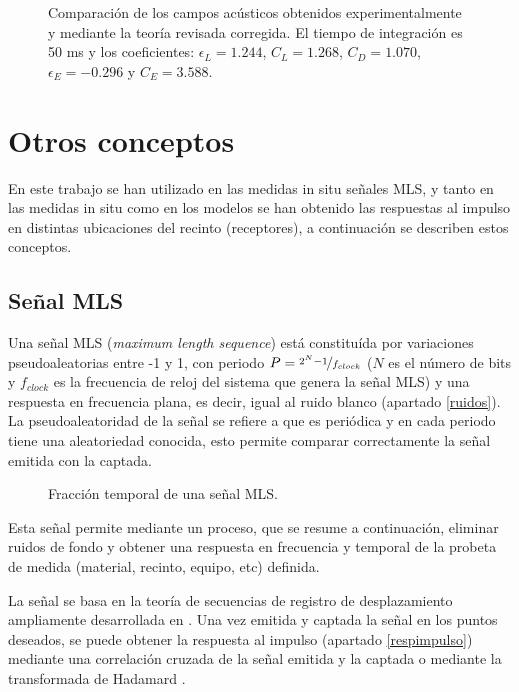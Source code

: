 \begin{figure}[ht]
    \centering
    {
    
    }
    \caption{Comparación de los campos acústicos obtenidos experimentalmente y mediante la teoría revisada corregida. El tiempo de integración es 50 ms y los coeficientes: $\epsilon_L=1.244$, $C_L=1.268$, $C_D=1.070$, $\epsilon_E=-0.296$ y $C_E=3.588$.}
    \label{graf:corregida}
\end{figure}
\FloatBarrier

\section{Otros conceptos}
En este trabajo se han utilizado en las medidas in situ señales MLS, y tanto en las medidas in situ como en los modelos se han obtenido las respuestas al impulso en distintas ubicaciones del recinto (receptores), a continuación se describen estos conceptos.


\subsection{Señal MLS}

Una señal MLS (\textit{maximum length sequence}) está constituída por variaciones pseudoaleatorias entre -1 y 1, con periodo $P=\nicefrac{2^N-1}{f_{clock}}$ ($N$ es el número de bits y $f_{clock}$ es la frecuencia de reloj del sistema que genera la señal MLS) y una respuesta en frecuencia plana, es decir, igual al ruido blanco (apartado \ref{ruidos}). La pseudoaleatoridad de la señal se refiere a que es periódica y en cada periodo tiene una aleatoriedad conocida, esto permite comparar correctamente la señal emitida con la captada.

\begin{figure}[ht]
    \centering
    {
    
    }
    \caption{Fracción temporal de una señal MLS.}
    \label{graf:mls}
\end{figure}


Esta señal permite mediante un proceso, que se resume a continuación, eliminar ruidos de fondo y obtener una respuesta en frecuencia y temporal de la probeta de medida (material, recinto, equipo, etc) definida.

La señal se basa en la teoría de secuencias de registro de desplazamiento ampliamente desarrollada en \cite{Golomb1967}. Una vez emitida y captada la señal en los puntos deseados, se puede obtener la respuesta al impulso (apartado \ref{respimpulso}) mediante una correlación cruzada de la señal emitida y la captada o mediante la transformada de Hadamard \citep{Sylvester1908}. 

